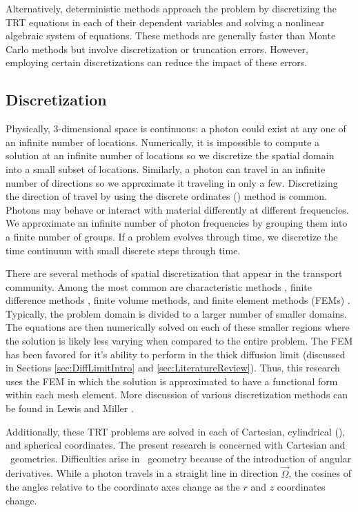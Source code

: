 \documentclass{article}
\begin{document}
Alternatively, deterministic methods approach the problem by discretizing the TRT equations in each of their dependent variables and solving a nonlinear algebraic system of equations. These methods are generally faster than Monte Carlo methods but involve discretization or truncation errors. However, employing certain discretizations can reduce the impact of these errors.

\subsection{Discretization}
\label{sec:DiscretizationIntro}

Physically, 3-dimensional space is continuous: a photon could exist at any one of an infinite number of locations. Numerically, it is impossible to compute a solution at an infinite number of locations so we discretize the spatial domain into a small subset of locations. Similarly, a photon can travel in an infinite number of directions so we approximate it traveling in only a few. Discretizing the direction of travel by using the discrete ordinates (\SN) method \cite{discrete_ordinates} is common. Photons may behave or interact with material differently at different frequencies. We approximate an infinite number of photon frequencies by grouping them into a finite number of groups. If a problem evolves through time, we discretize the time continuum with small discrete steps through time.

There are several methods of spatial discretization that appear in the transport community. Among the most common are characteristic methods \cite{AdamsCharacteristicMethods}, finite difference methods \cite{Lewis_Comp_Methods_Neu_Trans}, finite volume methods, and finite element methods (FEMs) \cite{Lewis_Comp_Methods_Neu_Trans}. Typically, the problem domain is divided to a larger number of smaller domains. The equations are then numerically solved on each of these smaller regions where the solution is likely less varying when compared to the entire problem. The FEM has been favored for it's ability to perform in the thick diffusion limit \cite{LarsenAsymptotic} (discussed in Sections \ref{sec:DiffLimitIntro} and \ref{sec:LiteratureReview}).
Thus, this research uses the FEM in which the solution is approximated to have a functional form within each mesh element. More discussion of various discretization methods can be found in Lewis and Miller \cite{Lewis_Comp_Methods_Neu_Trans}.

Additionally, these TRT problems are solved in each of Cartesian, cylindrical (\RZ), and spherical coordinates. The present research is concerned with Cartesian and \RZ\ geometries. Difficulties arise in \RZ\ geometry because of the introduction of angular derivatives. While a photon travels in a straight line in direction $\vec{\Omega}$, the cosines of the angles relative to the coordinate axes change as the $r$ and $z$ coordinates change.
\end{document}
